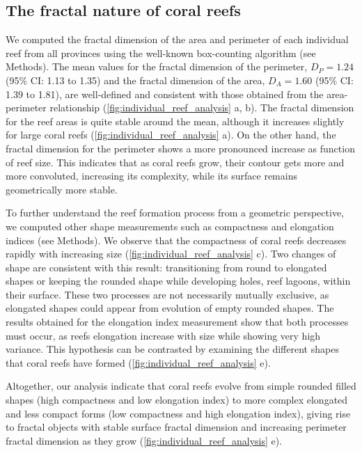 \subsection{The fractal nature of coral reefs}

We computed the fractal dimension of the area and perimeter of each
individual reef from all provinces using the well-known box-counting algorithm
(see Methods). The mean values for the fractal dimension of the perimeter,
$D_P=1.24$ (95\% CI: 1.13 to 1.35) and the fractal dimension of the area,
$D_A=1.60$ (95\% CI: 1.39 to 1.81), are well-defined and consistent with those
obtained from the area-perimeter relationship
(\cref{fig:individual_reef_analysis} a, b). The fractal dimension for the reef
areas is quite stable around the mean, although it increases slightly for large
coral reefs (\cref{fig:individual_reef_analysis} a). On the other hand, the
fractal dimension for the perimeter shows a more pronounced increase as
function of reef size. This indicates that as coral reefs grow, their contour
gets more and more convoluted, increasing its complexity, while its surface
remains geometrically more stable.

To further understand the reef formation process from a geometric
perspective, we computed other shape measurements such as compactness and
elongation indices (see Methods). We observe that the compactness of coral
reefs decreases rapidly with increasing size
(\cref{fig:individual_reef_analysis} c). Two changes of shape are consistent
with this result: transitioning from round to elongated shapes or keeping the
rounded shape while developing holes, reef lagoons, within their surface. These
two processes are not necessarily mutually exclusive, as elongated shapes could
appear from evolution of empty rounded shapes. The results obtained for the
elongation index measurement show that both processes must occur, as reefs
elongation increase with size while showing very high variance. This hypothesis
can be contrasted by examining the different shapes that coral reefs have
formed (\cref{fig:individual_reef_analysis} e).

Altogether, our analysis indicate that coral reefs evolve from simple
rounded filled shapes (high compactness and low elongation index) to more
complex elongated and less compact forms (low compactness and high elongation
index), giving rise to fractal objects with stable surface fractal dimension
and increasing perimeter fractal dimension as they grow
(\cref{fig:individual_reef_analysis} e).

